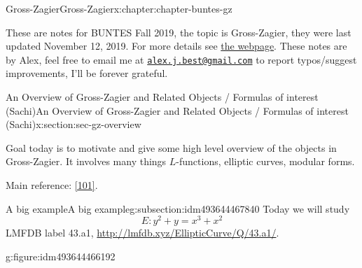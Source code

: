 \documentclass[oneside,10pt,]{book}
\numberwithin{equation}{section}
\begin{document}
\begin{chapterptx}{Gross-Zagier}{}{Gross-Zagier}{}{}{x:chapter:chapter-buntes-gz}
\begin{introduction}{}%
These are notes for BUNTES Fall 2019, the topic is Gross-Zagier, they were last updated November 12, 2019. For more details see \href{http://math.bu.edu/people/svh/GrossZagier.html}{the webpage}. These notes are by Alex, feel free to email me at \href{mailto:alex.j.best@gmail.com}{\nolinkurl{alex.j.best@gmail.com}} to report typos\slash{}suggest improvements, I'll be forever grateful.%
\end{introduction}%
%
%
\typeout{************************************************}
\typeout{************************************************}
%
\begin{sectionptx}{An Overview of Gross-Zagier and Related Objects \slash{} Formulas of interest (Sachi)}{}{An Overview of Gross-Zagier and Related Objects \slash{} Formulas of interest (Sachi)}{}{}{x:section:sec-gz-overview}
\begin{introduction}{}%
Goal today is to motivate and give some high level overview of the objects in Gross-Zagier. It involves many things \(L\)-functions, elliptic curves, modular forms.%
\par
Main reference: \hyperlink{x:biblio:bib-zagier-modular}{[101]}.%
\end{introduction}%
%
%
\typeout{************************************************}
\typeout{************************************************}
%
\begin{subsectionptx}{A big example}{}{A big example}{}{}{g:subsection:idm493644467840}
Today we will study%
\begin{equation*}
E\colon y^2 + y=  x^3 + x^2
\end{equation*}
LMFDB label 43.a1, \url{http://lmfdb.xyz/EllipticCurve/Q/43.a1/}.%
\begin{figureptx}{}{g:figure:idm493644466192}{}%
\begin{image}{0}{1}{0}%
\end{image}
\end{figureptx}
\end{subsectionptx}
\end{sectionptx}
\end{chapterptx}
\end{document}
